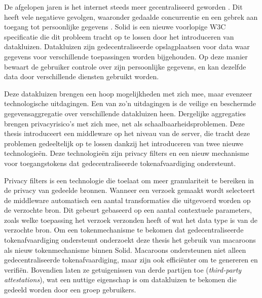 \begin{abstract*}
  De afgelopen jaren is het internet steeds meer gecentraliseerd geworden \citep{internet-report}. Dit heeft vele negatieve gevolgen, waaronder gedaalde concurrentie en een gebrek aan toegang tot persoonlijke gegevens \citep{big-tech-innovation, platform-monopolies}. Solid \citep{solid} is een nieuwe voorlopige W3C specificatie die dit probleem tracht op te lossen door het introduceren van datakluizen. Datakluizen zijn gedecentraliseerde opslagplaatsen voor data waar gegevens voor verschillende toepassingen worden bijgehouden. Op deze manier bewaart de gebruiker controle over zijn persoonlijke gegevens, en kan dezelfde data door verschillende diensten gebruikt worden.
  
  Deze datakluizen brengen een hoop mogelijkheden met zich mee, maar evenzeer technologische uitdagingen. Een van zo'n uitdagingen is de veilige en beschermde gegevensaggregatie over verschillende datakluizen heen. Dergelijke aggregaties brengen privacyrisico's met zich mee, net als schaalbaarheidsproblemen. Deze thesis introduceert een middleware op het niveau van de server, die tracht deze problemen gedeeltelijk op te lossen dankzij het introduceren van twee nieuwe technologie{\"e}n. Deze technologie{\"e}n zijn privacy filters en een nieuw mechanisme voor toegangstokens dat gedecentraliseerde tokenafvaardiging ondersteunt.

  Privacy filters is een technologie die toelaat om meer granulariteit te bereiken in de privacy van gedeelde bronnen. Wanneer een verzoek gemaakt wordt selecteert de middleware automatisch een aantal transformaties die uitgevoerd worden op de verzochte bron. Dit gebeurt gebaseerd op een aantal contextuele parameters, zoals welke toepassing het verzoek verzonden heeft of wat het data type is van de verzochte bron. Om een tokenmechanisme te bekomen dat gedecentraliseerde tokenafvaardiging ondersteunt onderzoekt deze thesis het gebruik van macaroons als nieuw tokenmechanisme binnen Solid. Macaroons ondersteunen niet alleen gedecentraliseerde tokenafvaardiging, maar zijn ook effici{\"e}nter om te genereren en verifi{\"e}n. Bovendien laten ze getuigenissen van derde partijen toe (\textit{third-party attestations}), wat een nuttige eigenschap is om datakluizen te bekomen die gedeeld worden door een groep gebruikers.
  

\end{abstract*}
